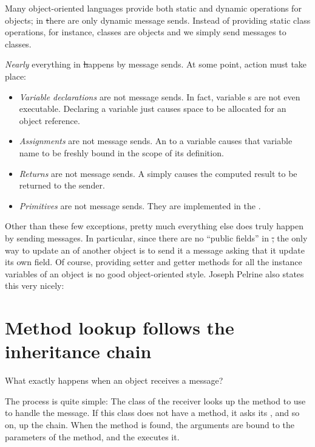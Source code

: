 \documentclass[a4paper,10pt,twoside]{book}
\begin{document}
Many object-oriented languages provide both static and dynamic operations for objects; in \st there are only dynamic message sends. Instead of providing static class operations, for instance, classes are objects and we simply send messages to classes.

\emph{Nearly} everything in \st happens by message sends.
At some point, action must take place:
\begin{itemize}
  \item \emph{Variable declarations} are not message sends.
  		In fact, variable s are not even executable.
  		Declaring a variable just causes space to be allocated for an object reference.
  \item \emph{Assignments} are not message sends.
  		An  to a variable causes that variable name to be freshly bound in the scope of its definition.
  \item \emph{Returns} are not message sends.
  		A  simply causes the computed result to be returned to the sender.
  \item \emph{Primitives} are not message sends.
  		They are implemented in the .
\end{itemize}
Other than these few exceptions, pretty much everything else does truly happen by sending messages.
In particular, since there are no ``public fields'' in \st, the only way to update an  of another object is to send it a message asking that it update its own field.
Of course, providing setter and getter methods for all the instance variables of an object is no good object-oriented style.
Joseph Pelrine also states this very nicely:

\section{Method lookup follows the inheritance chain}


What exactly happens when an object receives a message?

The process is quite simple:
The class of the receiver looks up the method to use to handle the message.
If this class does not have a method, it asks its , and so on, up the  chain.
When the method is found, the arguments are bound to the parameters of the method, and the  executes it.
\end{document}
